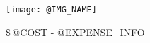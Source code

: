 \begin{figure}[h]
    \centering
    \texttt{[image: @IMG\_NAME]}
    \caption{\$\,@COST - @EXPENSE_INFO}
\end{figure}